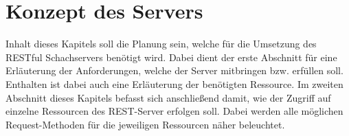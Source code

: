 
\chapter{Konzept des Servers}\label{sec:conceptServer}
Inhalt dieses Kapitels soll die Planung sein, welche für die Umsetzung des RESTful Schachservers benötigt wird. Dabei dient der erste Abschnitt für eine Erläuterung der Anforderungen, welche der Server mitbringen bzw. erfüllen soll. Enthalten ist dabei auch eine Erläuterung der benötigten Ressource. Im zweiten Abschnitt dieses Kapitels befasst sich anschließend damit, wie der Zugriff auf einzelne Ressourcen des REST-Server erfolgen soll. Dabei werden alle möglichen Request-Methoden für die jeweiligen Ressourcen näher beleuchtet.


